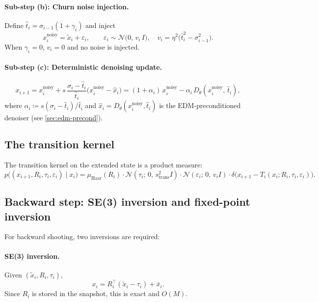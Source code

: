 \documentclass[11pt,a4paper]{article}
\newcommand{\N}{\mathcal{N}}
\newcommand{\Haar}{\mu_{\mathrm{Haar}}}
\newcommand{\xtilde}{\tilde{x}}
\newcommand{\xnoisy}{x^{\mathrm{noisy}}}
\newcommand{\xhat}{\hat{x}}
\newcommand{\that}{\hat{t}}
\newcommand{\Dtheta}{D_\theta}
\begin{document}
\paragraph{Sub-step (b): Churn noise injection.}
Define $\that_i = \sigma_{i-1}(1 + \gamma_i)$ and inject
\begin{equation}
  \xnoisy_i = \xtilde_i + \varepsilon_i,
  \qquad
  \varepsilon_i \sim \N\bigl(0,\, v_i\, I\bigr),\quad
  v_i = \eta^2\bigl(\that_i^2 - \sigma_{i-1}^2\bigr).
  \label{eq:noise-inject}
\end{equation}
When $\gamma_i = 0$, $v_i = 0$ and no noise is injected.

\paragraph{Sub-step (c): Deterministic denoising update.}
\begin{equation}
  x_{i+1} = \xnoisy_i + s\,\frac{\sigma_i - \that_i}{\that_i}
             \bigl(\xnoisy_i - \xhat_i\bigr)
  = (1 + \alpha_i)\,\xnoisy_i - \alpha_i\,\Dtheta(\xnoisy_i,\, \that_i),
  \label{eq:update-alpha}
\end{equation}
where $\alpha_i \coloneqq s(\sigma_i - \that_i)/\that_i$ and
$\xhat_i = \Dtheta(\xnoisy_i, \that_i)$ is the EDM-preconditioned
denoiser (see \cref{sec:edm-precond}).

\subsection{The transition kernel}
\label{sec:transition-kernel}

The transition kernel on the extended state is a product measure:
\begin{equation}
  p\bigl((x_{i+1}, R_i, \tau_i, \varepsilon_i) \mid x_i\bigr)
  =
  \Haar(R_i)\cdot
  \N(\tau_i;\, 0,\, s_{\mathrm{trans}}^2 I)\cdot
  \N(\varepsilon_i;\, 0,\, v_i I)\cdot
  \delta\bigl(x_{i+1} - T_i(x_i; R_i, \tau_i, \varepsilon_i)\bigr).
  \label{eq:transition-kernel}
\end{equation}

\subsection{Backward step: SE(3) inversion and fixed-point inversion}
\label{sec:backward-step}

For backward shooting, two inversions are required:

\paragraph{SE(3) inversion.}  Given $(\xtilde_i, R_i, \tau_i)$,
\begin{equation}
  x_i = R_i^\top(\xtilde_i - \tau_i) + \bar x_i.
  \label{eq:se3-inversion}
\end{equation}
Since $R_i$ is stored in the snapshot, this is exact and $O(M)$.
\end{document}
